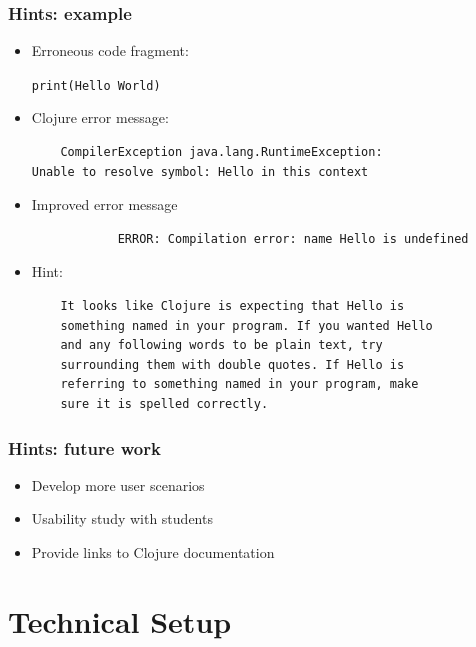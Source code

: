 \documentclass{beamer}
\begin{document}
\begin{frame}[fragile]
\frametitle{Hints: example}

	\begin{itemize}
		\item Erroneous code fragment:
		
			\texttt{print(Hello World)}

		\item Clojure error message:
		
  			 \begin{verbatim}
	CompilerException java.lang.RuntimeException:
Unable to resolve symbol: Hello in this context
			\end{verbatim}
			
		\item Improved error message
		
			\begin{verbatim}
			ERROR: Compilation error: name Hello is undefined
			\end{verbatim}
			
		\item Hint:
		
			\begin{verbatim}
	It looks like Clojure is expecting that Hello is
	something named in your program. If you wanted Hello
	and any following words to be plain text, try
	surrounding them with double quotes. If Hello is
	referring to something named in your program, make
	sure it is spelled correctly.
			\end{verbatim}
	
	\end{itemize}
\end{frame}

\begin{frame}
\frametitle{Hints: future work}
	\begin{itemize}
  	 \item Develop more user scenarios
  	 \item Usability study with students
  	 \item Provide links to Clojure documentation
	 \end{itemize}
\end{frame}

\section{Technical Setup}
\end{document}
